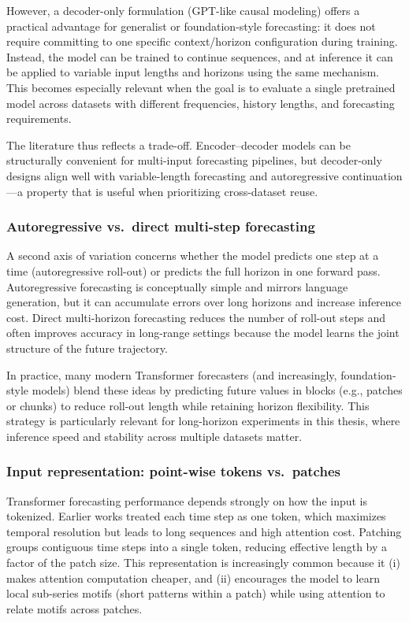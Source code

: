 However, a decoder-only formulation (GPT-like causal modeling) offers a practical advantage for generalist or foundation-style forecasting: it does not require committing to one specific context/horizon configuration during training. Instead, the model can be trained to continue sequences, and at inference it can be applied to variable input lengths and horizons using the same mechanism. This becomes especially relevant when the goal is to evaluate a single pretrained model across datasets with different frequencies, history lengths, and forecasting requirements.

The literature thus reflects a trade-off. Encoder--decoder models can be structurally convenient for multi-input forecasting pipelines, but decoder-only designs align well with variable-length forecasting and autoregressive continuation---a property that is useful when prioritizing cross-dataset reuse.

\subsubsection{Autoregressive vs.\ direct multi-step forecasting}
A second axis of variation concerns whether the model predicts one step at a time (autoregressive roll-out) or predicts the full horizon in one forward pass. Autoregressive forecasting is conceptually simple and mirrors language generation, but it can accumulate errors over long horizons and increase inference cost. Direct multi-horizon forecasting reduces the number of roll-out steps and often improves accuracy in long-range settings because the model learns the joint structure of the future trajectory.

In practice, many modern Transformer forecasters (and increasingly, foundation-style models) blend these ideas by predicting future values in blocks (e.g., patches or chunks) to reduce roll-out length while retaining horizon flexibility. This strategy is particularly relevant for long-horizon experiments in this thesis, where inference speed and stability across multiple datasets matter.

\subsubsection{Input representation: point-wise tokens vs.\ patches}
Transformer forecasting performance depends strongly on how the input is tokenized. Earlier works treated each time step as one token, which maximizes temporal resolution but leads to long sequences and high attention cost. Patching groups contiguous time steps into a single token, reducing effective length by a factor of the patch size. This representation is increasingly common because it (i) makes attention computation cheaper, and (ii) encourages the model to learn local sub-series motifs (short patterns within a patch) while using attention to relate motifs across patches.

